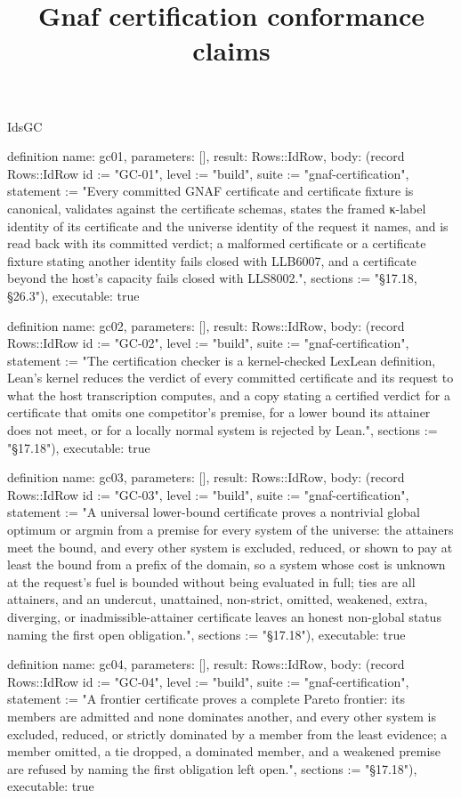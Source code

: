 \begin{lexlean}{IdsGC}
\title{Gnaf certification conformance claims}
\begin{semanticmodule}
definition{
  name: gc01,
  parameters: [],
  result: Rows::IdRow,
  body: (record Rows::IdRow {id := "GC-01", level := "build", suite := "gnaf-certification", statement := "Every committed GNAF certificate and certificate fixture is canonical, validates against the certificate schemas, states the framed κ-label identity of its certificate and the universe identity of the request it names, and is read back with its committed verdict; a malformed certificate or a certificate fixture stating another identity fails closed with LLB6007, and a certificate beyond the host's capacity fails closed with LLS8002.", sections := "§17.18, §26.3"}),
  executable: true
}

definition{
  name: gc02,
  parameters: [],
  result: Rows::IdRow,
  body: (record Rows::IdRow {id := "GC-02", level := "build", suite := "gnaf-certification", statement := "The certification checker is a kernel-checked LexLean definition, Lean's kernel reduces the verdict of every committed certificate and its request to what the host transcription computes, and a copy stating a certified verdict for a certificate that omits one competitor's premise, for a lower bound its attainer does not meet, or for a locally normal system is rejected by Lean.", sections := "§17.18"}),
  executable: true
}

definition{
  name: gc03,
  parameters: [],
  result: Rows::IdRow,
  body: (record Rows::IdRow {id := "GC-03", level := "build", suite := "gnaf-certification", statement := "A universal lower-bound certificate proves a nontrivial global optimum or argmin from a premise for every system of the universe: the attainers meet the bound, and every other system is excluded, reduced, or shown to pay at least the bound from a prefix of the domain, so a system whose cost is unknown at the request's fuel is bounded without being evaluated in full; ties are all attainers, and an undercut, unattained, non-strict, omitted, weakened, extra, diverging, or inadmissible-attainer certificate leaves an honest non-global status naming the first open obligation.", sections := "§17.18"}),
  executable: true
}

definition{
  name: gc04,
  parameters: [],
  result: Rows::IdRow,
  body: (record Rows::IdRow {id := "GC-04", level := "build", suite := "gnaf-certification", statement := "A frontier certificate proves a complete Pareto frontier: its members are admitted and none dominates another, and every other system is excluded, reduced, or strictly dominated by a member from the least evidence; a member omitted, a tie dropped, a dominated member, and a weakened premise are refused by naming the first obligation left open.", sections := "§17.18"}),
  executable: true
}


\end{semanticmodule}
\end{lexlean}
